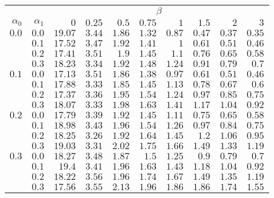 \begin{tabular}{rr|rrrrrrrr}
\hline\hline
 && \multicolumn{8}{c}{$\beta$}\\
 $\alpha_0$ & $\alpha_1$ & $0$ & $0.25$ & $0.5$ & $0.75$ & $1$ & $1.5$ & $2$ & $3$ \\ 
 \hline
$0.0$ & $0.0$ & $19.07$ & $3.44$ & $1.86$ & $1.32$ & $0.87$ & $0.47$ & $0.37$ & $0.35$\\ 
 & $0.1$ & $17.52$ & $3.47$ & $1.92$ & $1.41$ & $1$ & $0.61$ & $0.51$ & $0.46$\\ 
 & $0.2$ & $17.41$ & $3.51$ & $1.9$ & $1.45$ & $1.1$ & $0.76$ & $0.65$ & $0.58$\\ 
 & $0.3$ & $18.23$ & $3.34$ & $1.92$ & $1.48$ & $1.24$ & $0.91$ & $0.79$ & $0.7$\\ 
\hline 
 $0.1$ & $0.0$ & $17.13$ & $3.51$ & $1.86$ & $1.38$ & $0.97$ & $0.61$ & $0.51$ & $0.46$\\ 
 & $0.1$ & $17.88$ & $3.33$ & $1.85$ & $1.45$ & $1.13$ & $0.78$ & $0.67$ & $0.6$\\ 
 & $0.2$ & $17.37$ & $3.36$ & $1.95$ & $1.54$ & $1.24$ & $0.97$ & $0.85$ & $0.75$\\ 
 & $0.3$ & $18.07$ & $3.33$ & $1.98$ & $1.63$ & $1.41$ & $1.17$ & $1.04$ & $0.92$\\ 
\hline 
 $0.2$ & $0.0$ & $17.79$ & $3.39$ & $1.92$ & $1.45$ & $1.11$ & $0.75$ & $0.65$ & $0.58$\\ 
 & $0.1$ & $18.98$ & $3.43$ & $1.96$ & $1.54$ & $1.26$ & $0.97$ & $0.84$ & $0.75$\\ 
 & $0.2$ & $18.25$ & $3.26$ & $1.92$ & $1.64$ & $1.45$ & $1.2$ & $1.06$ & $0.95$\\ 
 & $0.3$ & $19.03$ & $3.31$ & $2.02$ & $1.75$ & $1.66$ & $1.49$ & $1.33$ & $1.19$\\ 
\hline 
 $0.3$ & $0.0$ & $18.27$ & $3.48$ & $1.87$ & $1.5$ & $1.25$ & $0.9$ & $0.79$ & $0.7$\\ 
 & $0.1$ & $19.4$ & $3.41$ & $1.96$ & $1.63$ & $1.43$ & $1.18$ & $1.04$ & $0.92$\\ 
 & $0.2$ & $18.22$ & $3.56$ & $1.96$ & $1.74$ & $1.67$ & $1.49$ & $1.35$ & $1.19$\\ 
 & $0.3$ & $17.56$ & $3.55$ & $2.13$ & $1.96$ & $1.86$ & $1.86$ & $1.74$ & $1.55$\\ 
 \hline 
 \end{tabular}